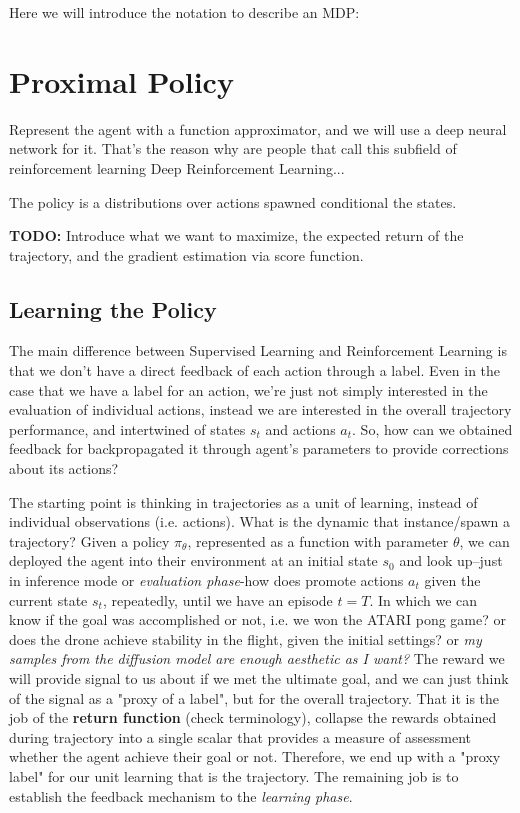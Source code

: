 Here we will introduce the notation to describe an MDP:

\section{Proximal Policy}

Represent the agent with a function approximator, and we will use a deep neural network for it. That's the reason why are people that call this subfield of reinforcement learning Deep Reinforcement Learning...

The policy is a distributions over actions spawned conditional the states.

\textbf{TODO:} Introduce what we want to maximize, the expected return of the trajectory, and the gradient estimation via score function.

\subsection{Learning the Policy}

The main difference between Supervised Learning and Reinforcement Learning is that we don't have a direct feedback of each action through a label. Even in the case that we have a label for an action, we're just not simply interested in the evaluation of individual actions, instead we are interested in the overall trajectory performance, and intertwined of states $s_t$ and actions $a_t$. So, how can we obtained feedback for backpropagated it through agent's parameters to provide corrections about its actions?

The starting point is thinking in trajectories as a unit of learning, instead of individual observations (i.e. actions). What is the dynamic that instance/spawn a trajectory? Given a policy $\pi_{\theta}$, represented as a function with parameter $\theta$, we can deployed the agent into their environment at an initial state $s_0$ and look up--just in inference mode or \textit{evaluation phase}-how does promote actions $a_t$ given the current state $s_t$, repeatedly, until we have an episode $t=T$. In which we can know if the goal was accomplished or not, i.e. we won the ATARI pong game? or does the drone achieve stability in the flight, given the initial settings? or \textit{my samples from the diffusion model are enough aesthetic as I want?} The reward we will provide signal to us about if we met the ultimate goal, and we can just think of the signal as a "proxy of a label", but for the overall trajectory. That it is the job of the \textbf{return function} (check terminology), collapse the rewards obtained during trajectory into a single scalar that provides a measure of assessment whether the agent achieve their goal or not. Therefore, we end up with a "proxy label" for our unit learning that is the trajectory. The remaining job is to establish the feedback mechanism to the \textit{learning phase}.

